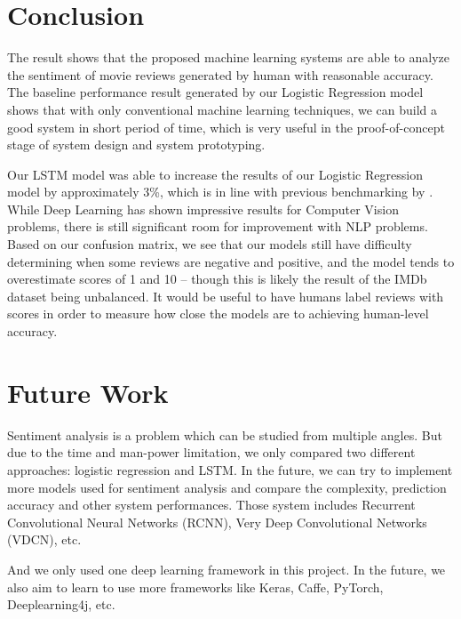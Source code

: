 \documentclass[conference]{IEEEtran}
\begin{document}
\section{Conclusion}
\label{conclusion}
    The result shows that the proposed machine learning systems are able to
    analyze the sentiment of movie reviews generated by human with reasonable
    accuracy. The baseline performance result generated by our Logistic Regression
    model shows that with only conventional machine learning techniques, we can
    build a good system in short period of time, which is very useful in the
    proof-of-concept stage of system design and system prototyping.

    Our LSTM model was able to increase the results of our Logistic Regression model
    by approximately 3\%, which is in line with previous benchmarking by \cite{W17-5202}.
    While Deep Learning has shown impressive results for Computer Vision problems,
    there is still significant room for improvement with NLP problems. Based on our confusion
    matrix, we see that our models still have difficulty determining when some reviews are
    negative and positive, and the model tends to overestimate scores of 1 and 10 -- though
    this is likely the result of the IMDb dataset being unbalanced. It would be useful to
    have humans label reviews with scores in order to measure how close the models
    are to achieving human-level accuracy.

\section{Future Work}
\label{future}
    Sentiment analysis is a problem which can be studied from multiple angles. But due
    to the time and man-power limitation, we only compared two different approaches:
    logistic regression and LSTM. In the future, we can try to implement more models used
    for sentiment analysis and compare the complexity, prediction accuracy and other
    system performances. Those system includes Recurrent Convolutional
    Neural Networks (RCNN)\cite{lai2015recurrent}, Very Deep Convolutional Networks
    (VDCN)\cite{conneau2017very}, etc.

    And we only used one deep learning framework in this project. In the future, we
    also aim to learn to use more frameworks like Keras\cite{chollet2015keras},
    Caffe\cite{jia2014caffe}, PyTorch\cite{paszke2017automatic},
    Deeplearning4j\cite{nicholson2017deeplearning4j}, etc.
\end{document}
